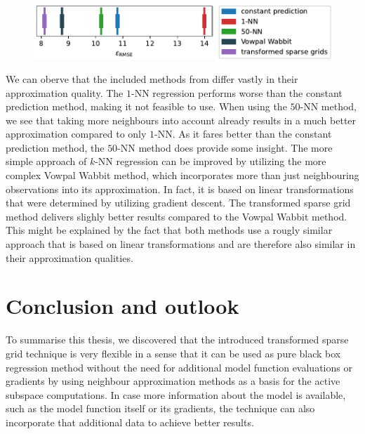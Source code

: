 \documentclass[
  a4paper,  %
  twoside,  %
  bibliography=totoc,
  headsepline,
  cleardoublepage=empty,
  parskip=half,
  draft=false
]{scrbook}
\begin{document}
\begin{mdframed}[style=style]
\begin{figure}[H]
\vspace{-2mm}
\includegraphics[width=\textwidth]{graphics/msd_comp}\vspace{-1mm}
\delimit
{}
\label{fig:msd_comp}
\end{figure}
\end{mdframed}
%
We can oberve that the included methods from \cite{BertinMahieux2011} differ vastly in their approximation quality.
The $1$-NN regression performs worse than the constant prediction method, making it not feasible to use.
When using the $50$-NN method, we see that taking more neighbours into account already results in a much better approximation compared to only $1$-NN.
As it fares better than the constant prediction method, the $50$-NN method does provide some insight.
The more simple approach of $k$-NN regression can be improved by utilizing the more complex Vowpal Wabbit method, which incorporates more than just neighbouring observations into its approximation.
In fact, it is based on linear transformations that were determined by utilizing gradient descent.
The transformed sparse grid method delivers slighly better results compared to the Vowpal Wabbit method.
This might be explained by the fact that both methods use a rougly similar approach that is based on linear transformations and are therefore also similar in their approximation qualities.


\chapter{Conclusion and outlook}
\label{chap:c9}

To summarise this thesis, we discovered that the introduced transformed sparse grid technique is very flexible in a sense that it can be used as pure black box regression method without the need for additional model function evaluations or gradients by using neighbour approximation methods as a basis for the active subspace computations.
In case more information about the model is available, such as the model function itself or its gradients, the technique can also incorporate that additional data to achieve better results.
\end{document}
